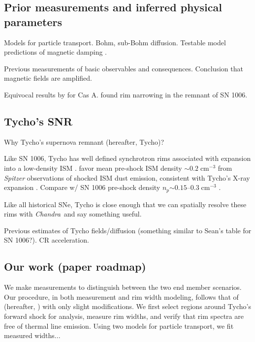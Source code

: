 \documentclass[iop, apj, numberedappendix, twocolappendix]{emulateapj}
\newcommand{\mt}{\mathrm}
\newcommand{\unit}[1]{\;\mt{#1}}  %
\newcommand{\abt}{\mathord{\sim}} %
\newcommand{\Chandra}{\textit{Chandra}\ }
\begin{document}
\subsection{Prior measurements and inferred physical parameters}

Models for particle transport.  Bohm, sub-Bohm diffusion.
Testable model predictions of magnetic damping \citep{pohl2005}.

Previous measurements of basic observables \citep[e.g.,][]{bamba2003,
bamba2005-hist, bamba2005-vela, parizot2006} and consequences.
Conclusion that magnetic fields are amplified.

Equivocal results by \citet{araya2010} for Cas A.
\citet{ressler2014} found rim narrowing in the remnant of SN 1006.

\subsection{Tycho's SNR}
Why Tycho's supernova remnant (hereafter, Tycho)?

Like SN 1006, Tycho has well defined synchrotron rims associated with expansion
into a low-density ISM .
\citet{williams2013} favor mean pre-shock ISM density $\abt 0.2 \unit{cm^{-3}}$
from \textit{Spitzer} observations of shocked ISM dust emission,
consistent with Tycho's X-ray expansion \citep{katsuda2010}.
Compare w/ SN 1006 pre-shock density $n_p \abt 0.15$--$0.3 \unit{cm^{-3}}$
\citep{raymond2007, heng2007, winkler2013}.  

Like all historical SNe, Tycho is close enough that we
can spatially resolve these rims with \Chandra and say something useful.

Previous estimates of Tycho fields/diffusion (something similar to Sean's table
for SN 1006?).  CR acceleration.

\subsection{Our work (paper roadmap)}

We make measurements to distinguish between the two end member scenarios.
Our procedure, in both measurement and rim width modeling, follows that of
\citet{ressler2014} (hereafter, ) with only slight
modifications.
We first select regions around Tycho's forward shock for analysis, measure
rim widths, and verify that rim spectra are free of thermal line emission.
Using two models for particle transport, we fit measured widths...
\end{document}
